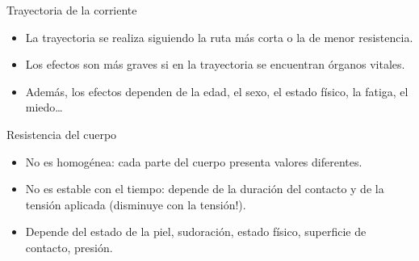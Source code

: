 \documentclass[xcolor={usenames,svgnames,dvipsnames}]{beamer}
\begin{document}
\begin{frame}[label={sec:org156bb4a}]{Trayectoria de la corriente}
\begin{itemize}
\item La trayectoria se realiza siguiendo la ruta más corta o la de menor
resistencia.

\item Los efectos son más graves si en la trayectoria se encuentran órganos
vitales.

\item Además, los efectos dependen de la edad, el sexo, el estado físico,
la fatiga, el miedo\ldots{}
\end{itemize}
\end{frame}

\begin{frame}[label={sec:org02c65c2}]{Resistencia del cuerpo}
\begin{itemize}
\item \alert{No es homogénea}: cada parte del cuerpo presenta valores diferentes.

\item \alert{No es estable con el tiempo}: depende de la duración del contacto
y de la tensión aplicada (disminuye con la tensión!).

\item Depende del estado de la piel, sudoración, estado físico, superficie
de contacto, presión.
\end{itemize}
\end{frame}
\end{document}
